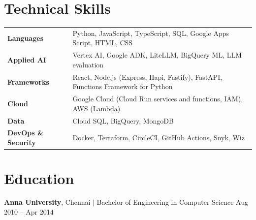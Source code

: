 \documentclass[letterpaper,11pt]{article}
\begin{document}
\section{Technical Skills}
{\small
\noindent\begin{tabularx}{\linewidth}{@{}l@{\hspace{1em}}>{\raggedright\arraybackslash}X@{}}
  \textbf{Languages} & Python, JavaScript, TypeScript, SQL, Google Apps Script, HTML, CSS \\
  \textbf{Applied AI} & Vertex AI, Google ADK, LiteLLM, BigQuery ML, LLM evaluation \\
  \textbf{Frameworks} & React, Node.js (Express, Hapi, Fastify), FastAPI, Functions Framework for Python \\
  \textbf{Cloud} & Google Cloud (Cloud Run services and functions, IAM), AWS (Lambda) \\
  \textbf{Data} & Cloud SQL, BigQuery, MongoDB \\
  \textbf{DevOps \& Security} & Docker, Terraform, CircleCI, GitHub Actions, Snyk, Wiz \\
\end{tabularx}\par}

\section{Education}
{\small \textbf{Anna University}, Chennai \enspace $|$ \enspace Bachelor of Engineering in Computer Science \hfill Aug 2010 -- Apr 2014}
\end{document}
